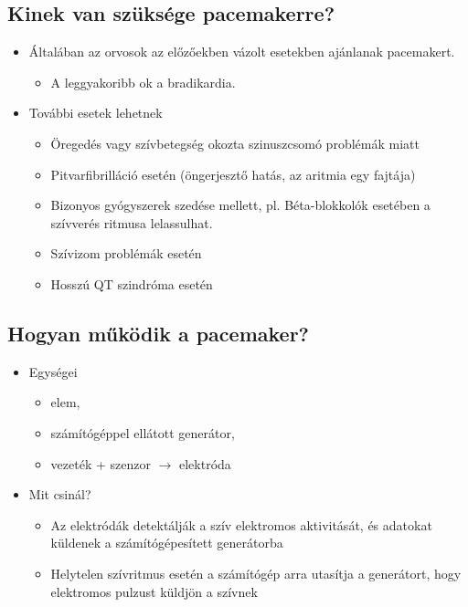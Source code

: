 \subsection{Kinek van szüksége pacemakerre?}
\begin{itemize}
    \item Általában az orvosok az előzőekben vázolt esetekben
    ajánlanak pacemakert.
    \begin{itemize}
        \item A leggyakoribb ok a bradikardia.
    \end{itemize}
    \item További esetek lehetnek
    \begin{itemize}
        \item Öregedés vagy szívbetegség okozta szinuszcsomó problémák
        miatt
        \item Pitvarfibrilláció esetén (öngerjesztő hatás, az aritmia egy fajtája)
        \item Bizonyos gyógyszerek szedése mellett, pl. Béta-blokkolók
        esetében a szívverés ritmusa lelassulhat.
        \item Szívizom problémák esetén
        \item Hosszú QT szindróma esetén
    \end{itemize}
\end{itemize}

\subsection{Hogyan működik a pacemaker?}
\begin{itemize}
    \item Egységei
    \begin{itemize}
        \item elem,
        \item számítógéppel ellátott generátor,
        \item vezeték + szenzor $\rightarrow$ elektróda
    \end{itemize}
    \item Mit csinál?
    \begin{itemize}
        \item Az elektródák detektálják a szív
        elektromos aktivitását, és adatokat
        küldenek a számítógépesített
        generátorba
        \item Helytelen szívritmus esetén a számítógép
        arra utasítja a generátort, hogy
        elektromos pulzust küldjön a szívnek
    \end{itemize}
\end{itemize}

